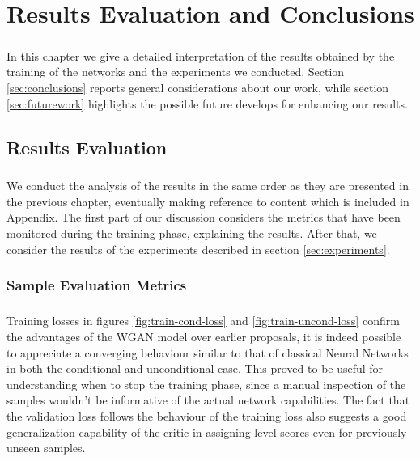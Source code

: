 \chapter{Results Evaluation and Conclusions}
\label{ch:results-conclusion}
\paragraph{} In this chapter we give a detailed interpretation of the results obtained by the training of the networks and the experiments we conducted. Section \ref{sec:conclusions} reports general considerations about our work, while section \ref{sec:futurework} highlights the possible future develops for enhancing our results.

\section{Results Evaluation}

\paragraph{} We conduct the analysis of the results in the same order as they are presented in the previous chapter, eventually making reference to content which is included in Appendix. The first part of our discussion considers the metrics that have been monitored during the training phase, explaining the results. After that, we consider the results of the experiments described in section \ref{sec:experiments}.
\subsection{Sample Evaluation Metrics}
\paragraph{} Training losses in figures \ref{fig:train-cond-loss} and \ref{fig:train-uncond-loss} confirm the advantages of the WGAN model over earlier proposals, it is indeed possible to appreciate a converging behaviour similar to that of classical Neural Networks in both the conditional and unconditional case. This proved to be useful for understanding when to stop the training phase, since a manual inspection of the samples wouldn't be informative of the actual network capabilities. The fact that the validation loss follows the behaviour of the training loss also suggests a good generalization capability of the critic in assigning level scores even for previously unseen samples. 

